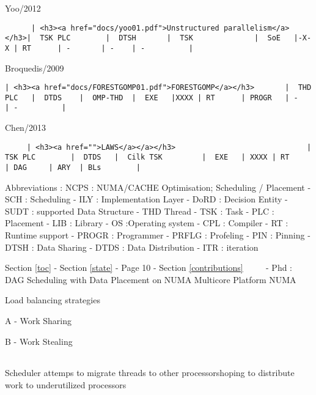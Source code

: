 \documentclass[11pt]{article}
\begin{document}
Yoo/2012

\begin{verbatim}
      | <h3><a href="docs/yoo01.pdf">Unstructured parallelism</a></h3>|  TSK PLC        |  DTSH       |  TSK              |  SoE   |-X-X | RT      | -       | -    | -          |
\end{verbatim}

\textbar{}

Broquedis/2009

\begin{verbatim}
| <h3><a href="docs/FORESTGOMP01.pdf">FORESTGOMP</a></h3>       |  THD PLC   |  DTDS    |  OMP-THD  |  EXE   |XXXX | RT      | PROGR   | -    | -          |
\end{verbatim}

\textbar{}

Chen/2013

\begin{verbatim}
     | <h3><a href="">LAWS</a></a></h3>                              |  TSK PLC        |  DTDS   |  Cilk TSK         |  EXE   | XXXX | RT     | DAG     | ARY  | BLs        |
\end{verbatim}

Abbreviations : NCPS : NUMA/CACHE Optimisation; Scheduling / Placement -
SCH : Scheduling - ILY : Implementation Layer - DoRD : Decision Entity -
SUDT : supported Data Structure - THD Thread - TSK : Task - PLC :
Placement - LIB : Library - OS :Operating system - CPL : Compiler - RT :
Runtime support - PROGR : Programmer - PRFLG : Profeling - PIN : Pinning
- DTSH : Data Sharing - DTDS : Data Distribution - ITR : iteration

     {Section \ref{toc} - Section \ref{state} - Page 10 -
Section \ref{contributions} ~~~~ - Phd : DAG Scheduling with Data
Placement on NUMA Multicore Platform} NUMA

Load balancing strategies

\textbar{}

A - Work Sharing

\textbar{} \textbar{}

B - Work Stealing

\begin{longtable}[]{@{}lll@{}}
\toprule
\bottomrule
\end{longtable}

\textbar{}

Scheduler attemps to migrate threads to other processorshoping to
distribute work to underutilized processors

\textbar{} \textbar{}
\end{document}
